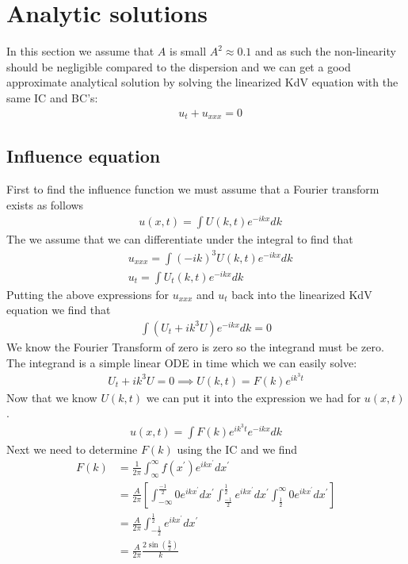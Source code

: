 \documentclass{article}
\begin{document}
\section{Analytic solutions}
In this section we assume that $A$ is small $A^2\approx0.1$ and as such the non-linearity should be negligible compared to the dispersion and we can get a good approximate analytical solution by solving the linearized KdV equation with the same IC and BC's:
\begin{align*}
&u_t + u_{xxx} = 0
\end{align*}
\subsection{Influence equation}
First to find the influence function we must assume that a Fourier transform exists as follows
\begin{align*}
&u(x,t) = \int U(k,t)e^{-ikx}dk
\end{align*}
The we assume that we can differentiate under the integral to find that
\begin{align*}
&u_{xxx} = \int (-ik)^3U(k,t)e^{-ikx}dk \\
&u_t = \int U_t(k,t)e^{-ikx}dk
\end{align*}
Putting the above expressions for $u_{xxx}$ and $u_t$ back into the linearized KdV equation we find that
\begin{align*}
\int (U_t + ik^3 U) e^{-ikx}dk = 0
\end{align*}
We know the Fourier Transform of zero is zero so the integrand must be zero. The integrand is a simple linear ODE in time which we can easily solve:
\begin{align*}
U_t + ik^3U = 0 \implies U(k,t) = F(k)e^{ik^3t}
\end{align*}
Now that we know $U(k,t)$ we can put it into the expression we had for $u(x,t)$.
\begin{align*}
u(x,t) = \int F(k) e^{ik^3t}e^{-ikx}dk
\end{align*} 
Next we need to determine $F(k)$ using the IC and we find
\begin{align*}
F(k) &= \frac{1}{2\pi} \int_{\infty}^{\infty} f(x^\prime) e^{ikx^\prime}dx^\prime \\
&= \frac{A}{2\pi} \left[ \int_{-\infty}^\frac{-1}{2} 0e^{ikx^\prime}dx^\prime        \int_\frac{-1}{2}^\frac{1}{2}e^{ikx^\prime}dx^\prime \int^{\infty}_\frac{1}{2} 0e^{ikx^\prime}dx^\prime\right] \\
&= \frac{A}{2\pi}\int_{-\frac{1}{2}}^\frac{1}{2}e^{ikx^\prime}dx^\prime \\
&= \frac{A}{2\pi}\frac{2\sin(\frac{k}{2})}{k}
\end{align*}
\end{document}
